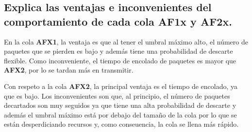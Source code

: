 \subsection{Explica las ventajas e inconvenientes del comportamiento de cada cola AF1x y AF2x. }

En la cola \textbf{AFX1}, la ventaja es que al tener el umbral máximo alto, el número de paquetes que se pierden es bajo y además tiene una probabilidad
de descarte flexible. Como inconveniente, el tiempo de encolado de paquetes es mayor que \textbf{AFX2}, por lo se tardan más en transmitir.

Con respeto a la cola \textbf{AFX2}, la principal ventaja es el tiempo de encolado, ya que es bajo. 
Los inconvenientes son que, al principio, el número de paquetes decartados son muy seguidos ya que tiene una alta probabilidad de descarte y además el
umbral máximo está por debajo del tamaño de la cola por lo que se están desperdiciando recursos y, como conseuencia, la cola se llena más rápido.
 


